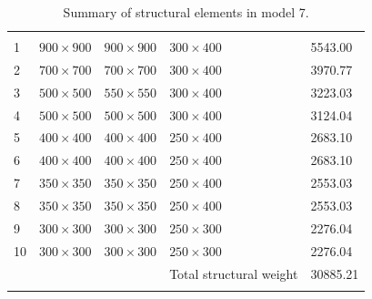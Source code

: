 \documentclass{cup-pan}
\begin{document}
\renewcommand{\arraystretch}{1}
\begin{longtable}{P{0.5in} P{1in} P{1in} P{1in} P{1in}}
\caption{Summary of structural elements in model 7.}\\
\headrow {} &  &  &  &  \\
1 & $900\times900$ & $900\times900$ & $300\times400$ & \num{5543.00} \\
2 & $700\times700$ & $700\times700$ & $300\times400$ & \num{3970.77} \\
3 & $500\times500$ & $550\times550$ & $300\times400$ & \num{3223.03} \\
4 & $500\times500$ & $500\times500$ & $300\times400$ & \num{3124.04} \\
5 & $400\times400$ & $400\times400$ & $250\times400$ & \num{2683.10} \\
6 & $400\times400$ & $400\times400$ & $250\times400$ & \num{2683.10} \\
7 & $350\times350$ & $350\times350$ & $250\times400$ & \num{2553.03} \\
8 & $350\times350$ & $350\times350$ & $250\times400$ & \num{2553.03} \\
9 & $300\times300$ & $300\times300$ & $250\times300$ & \num{2276.04} \\
10 & $300\times300$ & $300\times300$ & $250\times300$ & \num{2276.04} \\
 &  & & Total structural weight & \num{30885.21} \\
\label{tab:cross section model 7}
\end{longtable}
\end{document}
